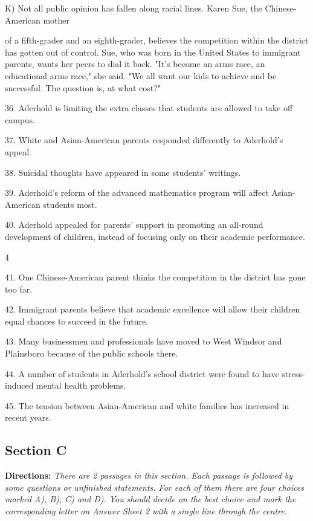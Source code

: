 \documentclass[UTF8,11pt]{ctexart}
\begin{document}
K) Not all public opinion has fallen along racial lines. Karen Sue, the Chinese-American mother


of a fifth-grader and an eighth-grader, believes the competition within the district has gotten out of control. Sue, who was born in the United States to immigrant parents, wants her peers to dial it back. "It's become an arms race, an educational arms race," she said. "We all want our kids to achieve and be successful. The question is, at what cost?"


36. Aderhold is limiting the extra classes that students are allowed to take off campus.


37. White and Asian-American parents responded differently to Aderhold's appeal.


38. Suicidal thoughts have appeared in some students' writings.


39. Aderhold's reform of the advanced mathematics program will affect Asian-American students most.


40. Aderhold appealed for parents' support in promoting an all-round development of children, instead of focusing only on their academic performance.


4


41. One Chinese-American parent thinks the competition in the district has gone too far.


42. Immigrant parents believe that academic excellence will allow their children equal chances to succeed in the future.


43. Many businessmen and professionals have moved to West Windsor and Plainsboro because of the public schools there.


44. A number of students in Aderhold's school district were found to have stress-induced mental health problems.


45. The tension between Asian-American and white families has increased in recent years.


\subsection*{\textbf{Section C}}


\textbf{Directions:}\textit{ There are 2 passages in this section. Each passage is followed by some questions or} \textit{unfinished statements. For each of them there are four choices marked A), B), C) and D). You} \textit{should decide on the best choice and mark the corresponding letter on Answer Sheet 2 with a} \textit{single line through the centre.}
\end{document}
